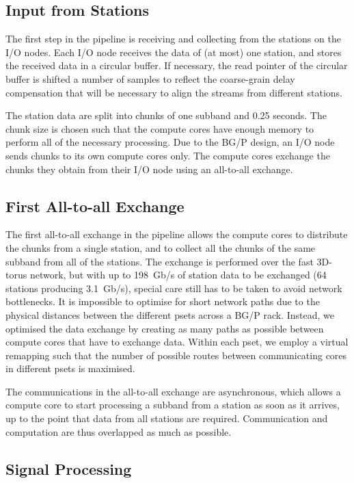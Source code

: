 \documentclass{llncs}
\begin{document}
\subsection{Input from Stations}
The first step in the pipeline is receiving and collecting from the stations on the I/O nodes. Each I/O node receives the data of (at most) one station, and stores the received data in a circular buffer. If necessary, the read pointer of the circular buffer is shifted a number of samples to reflect the coarse-grain delay compensation that will be necessary to align the streams from different stations.

The station data are split into chunks of one subband and 0.25 seconds. The chunk size is chosen such that the compute cores have enough memory to perform all of the necessary processing. Due to the BG/P design, an I/O node sends chunks to its own compute cores only. The compute cores exchange the chunks they obtain from their I/O node using an all-to-all exchange. 

\subsection{First All-to-all Exchange}

The first all-to-all exchange in the pipeline allows the compute cores to distribute the chunks from a single station, and to collect all the chunks of the same subband from all of the stations. The exchange is performed over the fast 3D-torus network, but with up to 198~Gb/s of station data to be exchanged (64 stations producing 3.1~Gb/s), special care still has to be taken to avoid network bottlenecks. It is impossible to optimise for short network paths due to the physical distances between the different psets across a BG/P rack. Instead, we optimised the data exchange by creating as many paths as possible between compute cores that have to exchange data. Within each pset, we employ a virtual remapping such that the number of possible routes between communicating cores in different psets is maximised.

The communications in the all-to-all exchange are asynchronous, which allows a compute core to start processing a subband from a station as soon as it arrives, up to the point that data from all stations are required. Communication and computation are thus overlapped as much as possible.

\subsection{Signal Processing}
\end{document}
